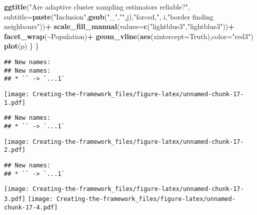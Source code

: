 \documentclass[
]{article}
\newenvironment{Shaded}{\begin{snugshade}}{\end{snugshade}}
\newcommand{\AttributeTok}[1]{\textcolor[rgb]{0.13,0.29,0.53}{#1}}
\newcommand{\FunctionTok}[1]{\textcolor[rgb]{0.13,0.29,0.53}{\textbf{#1}}}
\newcommand{\NormalTok}[1]{#1}
\newcommand{\SpecialCharTok}[1]{\textcolor[rgb]{0.81,0.36,0.00}{\textbf{#1}}}
\newcommand{\StringTok}[1]{\textcolor[rgb]{0.31,0.60,0.02}{#1}}
\begin{document}
\begin{Shaded}
\begin{Highlighting}[]
      \FunctionTok{ggtitle}\NormalTok{(}\StringTok{"Are adaptive cluster sampling estimators reliable?"}\NormalTok{,}
              \AttributeTok{subtitle=}\FunctionTok{paste}\NormalTok{(}\StringTok{"Inclusion"}\NormalTok{,}\FunctionTok{gsub}\NormalTok{(}\StringTok{"\_"}\NormalTok{,}\StringTok{""}\NormalTok{,j),}\StringTok{"forced,"}\NormalTok{, i,}\StringTok{"border finding neighbours"}\NormalTok{))}\SpecialCharTok{+}
      \FunctionTok{scale\_fill\_manual}\NormalTok{(}\AttributeTok{values=}\FunctionTok{c}\NormalTok{(}\StringTok{"lightblue3"}\NormalTok{,}\StringTok{"lightblue3"}\NormalTok{))}\SpecialCharTok{+}
      \FunctionTok{facet\_wrap}\NormalTok{(}\SpecialCharTok{\textasciitilde{}}\NormalTok{Population)}\SpecialCharTok{+}
      \FunctionTok{geom\_vline}\NormalTok{(}\FunctionTok{aes}\NormalTok{(}\AttributeTok{xintercept=}\NormalTok{Truth),}\AttributeTok{color=}\StringTok{"red3"}\NormalTok{)}
    \FunctionTok{plot}\NormalTok{(p)}
\NormalTok{  \}}
\NormalTok{\}}
\end{Highlighting}
\end{Shaded}

\begin{verbatim}
## New names:
## New names:
## * `` -> `...1`
\end{verbatim}

\texttt{[image: Creating-the-framework\_files/figure-latex/unnamed-chunk-17-1.pdf]}

\begin{verbatim}
## New names:
## * `` -> `...1`
\end{verbatim}

\texttt{[image: Creating-the-framework\_files/figure-latex/unnamed-chunk-17-2.pdf]}

\begin{verbatim}
## New names:
## * `` -> `...1`
\end{verbatim}

\texttt{[image: Creating-the-framework\_files/figure-latex/unnamed-chunk-17-3.pdf]}
\texttt{[image: Creating-the-framework\_files/figure-latex/unnamed-chunk-17-4.pdf]}
\end{document}
